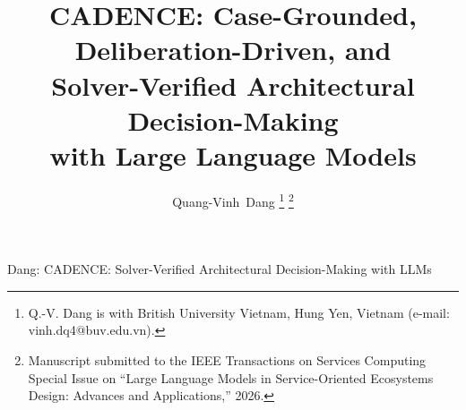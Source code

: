 \documentclass[lettersize,journal]{IEEEtran}
\begin{document}
\title{CADENCE: Case-Grounded, Deliberation-Driven, and\\ Solver-Verified Architectural Decision-Making\\ with Large Language Models}

\author{Quang-Vinh~Dang
\thanks{Q.-V. Dang is with British University Vietnam, Hung Yen, Vietnam (e-mail: vinh.dq4@buv.edu.vn).}
\thanks{Manuscript submitted to the IEEE Transactions on Services Computing Special Issue on ``Large Language Models in Service-Oriented Ecosystems Design: Advances and Applications,'' 2026.}}

%
{Dang: CADENCE: Solver-Verified Architectural Decision-Making with LLMs}

\maketitle
\end{document}

